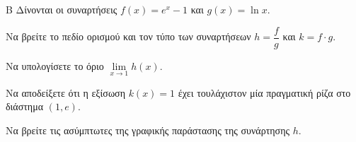 \begin{thema}{Β}
Δίνονται οι συναρτήσεις $f(x) = e^x - 1$ και $g(x) = \ln x$. 
\begin{erwthma}
\item Να βρείτε το πεδίο ορισμού και τον τύπο των συναρτήσεων $h = \dfrac{f}{g}$ και $k = f \cdot g$.
\item Να υπολογίσετε το όριο $\lim\limits_{x \to 1} h(x)$.
\item Να αποδείξετε ότι η εξίσωση $k(x) = 1$ έχει τουλάχιστον μία πραγματική ρίζα στο διάστημα $(1, e)$.
\item Να βρείτε τις ασύμπτωτες της γραφικής παράστασης της συνάρτησης $h$.
\end{erwthma}
\end{thema}

